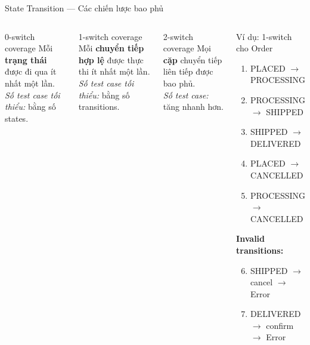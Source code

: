 \documentclass[aspectratio=169,12pt]{beamer}
\begin{document}
\begin{frame}[shrink=10]{State Transition --- Các chiến lược bao phủ}
  \small
  \begin{columns}[T,totalwidth=\textwidth]
    \begin{block}{0-switch coverage}
      Mỗi \textbf{trạng thái} được đi qua ít nhất một lần.\\
      \textit{Số test case tối thiểu:} bằng số states.
    \end{block}

    \begin{block}{1-switch coverage}
      Mỗi \textbf{chuyển tiếp hợp lệ} được thực thi ít nhất một lần.\\
      \textit{Số test case tối thiểu:} bằng số transitions.
    \end{block}

    \begin{block}{2-switch coverage}
      Mọi \textbf{cặp} chuyển tiếp liên tiếp được bao phủ.\\
      \textit{Số test case:} tăng nhanh hơn.
    \end{block}

    \begin{exampleblock}{Ví dụ: 1-switch cho Order}
      \begin{enumerate}
        \item PLACED $\to$ PROCESSING
        \item PROCESSING $\to$ SHIPPED
        \item SHIPPED $\to$ DELIVERED
        \item PLACED $\to$ CANCELLED
        \item PROCESSING $\to$ CANCELLED
      \end{enumerate}
      \textbf{Invalid transitions:}
      \begin{enumerate}
        \setcounter{enumi}{5}
        \item SHIPPED $\to$ cancel $\to$ Error
        \item DELIVERED $\to$ confirm $\to$ Error
      \end{enumerate}
    \end{exampleblock}
  \end{columns}
\end{frame}

\end{document}
